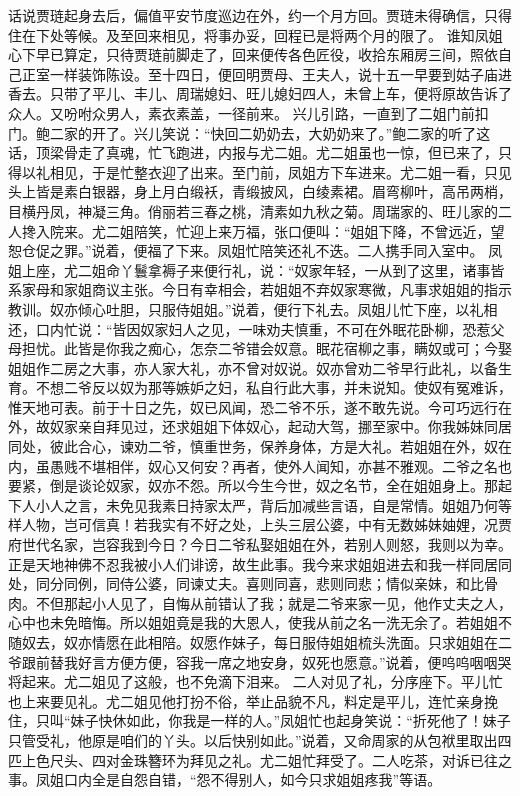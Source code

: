 \documentclass[12pt,oneside]{book}
\begin{document}
话说贾琏起身去后，偏值平安节度巡边在外，约一个月方回。贾琏未得确信，只得住在下处等候。及至回来相见，将事办妥，回程已是将两个月的限了。
谁知凤姐心下早已算定，只待贾琏前脚走了，回来便传各色匠役，收拾东厢房三间，照依自己正室一样装饰陈设。至十四日，便回明贾母、王夫人，说十五一早要到姑子庙进香去。只带了平儿、丰儿、周瑞媳妇、旺儿媳妇四人，未曾上车，便将原故告诉了众人。又吩咐众男人，素衣素盖，一径前来。
兴儿引路，一直到了二姐门前扣门。鲍二家的开了。兴儿笑说：“快回二奶奶去，大奶奶来了。”鲍二家的听了这话，顶梁骨走了真魂，忙飞跑进，内报与尤二姐。尤二姐虽也一惊，但已来了，只得以礼相见，于是忙整衣迎了出来。至门前，凤姐方下车进来。尤二姐一看，只见头上皆是素白银器，身上月白缎袄，青缎披风，白绫素裙。眉弯柳叶，高吊两梢，目横丹凤，神凝三角。俏丽若三春之桃，清素如九秋之菊。周瑞家的、旺儿家的二人搀入院来。尤二姐陪笑，忙迎上来万福，张口便叫：“姐姐下降，不曾远近，望恕仓促之罪。”说着，便福了下来。凤姐忙陪笑还礼不迭。二人携手同入室中。
凤姐上座，尤二姐命丫鬟拿褥子来便行礼，说：“奴家年轻，一从到了这里，诸事皆系家母和家姐商议主张。今日有幸相会，若姐姐不弃奴家寒微，凡事求姐姐的指示教训。奴亦倾心吐胆，只服侍姐姐。”说着，便行下礼去。凤姐儿忙下座，以礼相还，口内忙说：“皆因奴家妇人之见，一味劝夫慎重，不可在外眠花卧柳，恐惹父母担忧。此皆是你我之痴心，怎奈二爷错会奴意。眠花宿柳之事，瞒奴或可；今娶姐姐作二房之大事，亦人家大礼，亦不曾对奴说。奴亦曾劝二爷早行此礼，以备生育。不想二爷反以奴为那等嫉妒之妇，私自行此大事，并未说知。使奴有冤难诉，惟天地可表。前于十日之先，奴已风闻，恐二爷不乐，遂不敢先说。今可巧远行在外，故奴家亲自拜见过，还求姐姐下体奴心，起动大驾，挪至家中。你我姊妹同居同处，彼此合心，谏劝二爷，慎重世务，保养身体，方是大礼。若姐姐在外，奴在内，虽愚贱不堪相伴，奴心又何安？再者，使外人闻知，亦甚不雅观。二爷之名也要紧，倒是谈论奴家，奴亦不怨。所以今生今世，奴之名节，全在姐姐身上。那起下人小人之言，未免见我素日持家太严，背后加减些言语，自是常情。姐姐乃何等样人物，岂可信真！若我实有不好之处，上头三层公婆，中有无数姊妹妯娌，况贾府世代名家，岂容我到今日？今日二爷私娶姐姐在外，若别人则怒，我则以为幸。正是天地神佛不忍我被小人们诽谤，故生此事。我今来求姐姐进去和我一样同居同处，同分同例，同侍公婆，同谏丈夫。喜则同喜，悲则同悲；情似亲妹，和比骨肉。不但那起小人见了，自悔从前错认了我；就是二爷来家一见，他作丈夫之人，心中也未免暗悔。所以姐姐竟是我的大恩人，使我从前之名一洗无余了。若姐姐不随奴去，奴亦情愿在此相陪。奴愿作妹子，每日服侍姐姐梳头洗面。只求姐姐在二爷跟前替我好言方便方便，容我一席之地安身，奴死也愿意。”说着，便呜呜咽咽哭将起来。尤二姐见了这般，也不免滴下泪来。
二人对见了礼，分序座下。平儿忙也上来要见礼。尤二姐见他打扮不俗，举止品貌不凡，料定是平儿，连忙亲身挽住，只叫“妹子快休如此，你我是一样的人。”凤姐忙也起身笑说：“折死他了！妹子只管受礼，他原是咱们的丫头。以后快别如此。”说着，又命周家的从包袱里取出四匹上色尺头、四对金珠簪环为拜见之礼。尤二姐忙拜受了。二人吃茶，对诉已往之事。凤姐口内全是自怨自错，“怨不得别人，如今只求姐姐疼我”等语。
\end{document}
